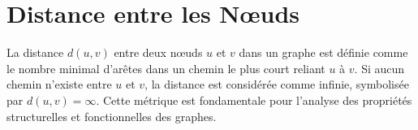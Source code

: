 
\section{Distance entre les Nœuds}
La distance \( d(u, v) \) entre deux nœuds \( u \) et \( v \) dans un graphe est définie comme le nombre minimal d'arêtes dans un chemin le plus court reliant \( u \) à \( v \). Si aucun chemin n'existe entre \( u \) et \( v \), la distance est considérée comme infinie, symbolisée par \( d(u, v) = \infty \). Cette métrique est fondamentale pour l'analyse des propriétés structurelles et fonctionnelles des graphes.

